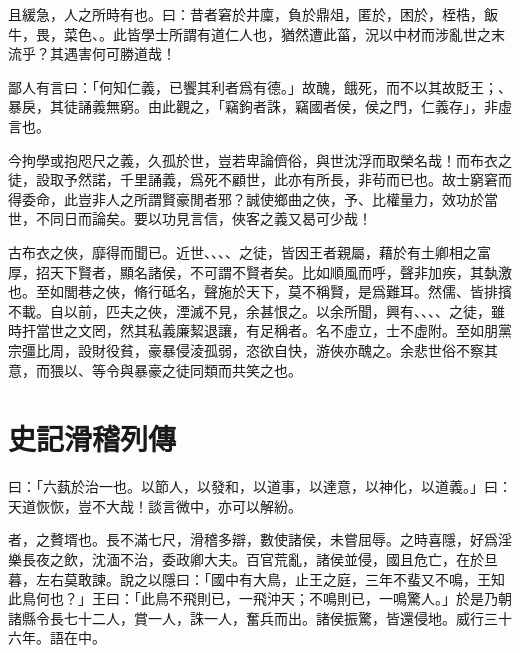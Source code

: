 且緩急，人之所時有也。曰：昔者窘於井廩，負於鼎俎，匿於，困於，桎梏，飯牛，畏，菜色、。此皆學士所謂有道仁人也，猶然遭此菑，況以中材而涉亂世之末流乎？其遇害何可勝道哉！

鄙人有言曰：「何知仁義，已饗其利者爲有德。」故醜，餓死，而不以其故貶王；、暴戾，其徒誦義無窮。由此觀之，「竊鉤者誅，竊國者侯，侯之門，仁義存」，非虛言也。

今拘學或抱咫尺之義，久孤於世，豈若卑論儕俗，與世沈浮而取榮名哉！而布衣之徒，設取予然諾，千里誦義，爲死不顧世，此亦有所長，非茍而已也。故士窮窘而得委命，此豈非人之所謂賢豪閒者邪？誠使鄉曲之俠，予、比權量力，效功於當世，不同日而論矣。要以功見言信，俠客之義又曷可少哉！

古布衣之俠，靡得而聞已。近世、、、、之徒，皆因王者親屬，藉於有土卿相之富厚，招天下賢者，顯名諸侯，不可謂不賢者矣。比如順風而呼，聲非加疾，其埶激也。至如閭巷之俠，脩行砥名，聲施於天下，莫不稱賢，是爲難耳。然儒、皆排擯不載。自以前，匹夫之俠，湮滅不見，余甚恨之。以余所聞，興有、、、、之徒，雖時扞當世之文罔，然其私義廉絜退讓，有足稱者。名不虛立，士不虛附。至如朋黨宗彊比周，設財役貧，豪暴侵淩孤弱，恣欲自快，游俠亦醜之。余悲世俗不察其意，而猥以、等令與暴豪之徒同類而共笑之也。

\theendnotes

\section[滑稽列傳\quad{\small 史記}]{{\normalsize 史記}\quad 滑稽列傳}
曰：「六蓺於治一也。以節人，以發和，以道事，以達意，以神化，以道義。」曰：天道恢恢，豈不大哉！談言微中，亦可以解紛。

者，之贅壻也。長不滿七尺，滑稽多辯，數使諸侯，未嘗屈辱。之時喜隱，好爲淫樂長夜之飲，沈湎不治，委政卿大夫。百官荒亂，諸侯並侵，國且危亡，在於旦暮，左右莫敢諫。說之以隱曰：「國中有大鳥，止王之庭，三年不蜚又不鳴，王知此鳥何也？」王曰：「此鳥不飛則已，一飛沖天；不鳴則已，一鳴驚人。」於是乃朝諸縣令長七十二人，賞一人，誅一人，奮兵而出。諸侯振驚，皆還侵地。威行三十六年。語在中。


